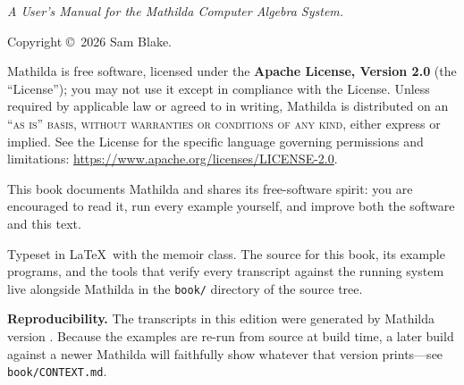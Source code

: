 \thispagestyle{empty}
\noindent
\textit{A User's Manual for the Mathilda Computer Algebra System.}

\vspace{1em}
\noindent
Copyright \copyright\ 2026 Sam Blake.

\vspace{1em}
\noindent
Mathilda is free software, licensed under the \textbf{Apache License, Version 2.0}
(the ``License''); you may not use it except in compliance with the License.
Unless required by applicable law or agreed to in writing, Mathilda is
distributed on an \textsc{``as is'' basis, without warranties or conditions of
any kind}, either express or implied. See the License for the specific language
governing permissions and limitations:
\url{https://www.apache.org/licenses/LICENSE-2.0}.

\vspace{1em}
\noindent
This book documents Mathilda and shares its free-software spirit: you are
encouraged to read it, run every example yourself, and improve both the software
and this text.

\vspace{1em}
\noindent
Typeset in \LaTeX\ with the \textsf{memoir} class. The source for this book, its
example programs, and the tools that verify every transcript against the running
system live alongside Mathilda in the \texttt{book/} directory of the source
tree.

\vfill
\noindent
\textbf{Reproducibility.} The transcripts in this edition were generated by
Mathilda version \texttt{\mathildaversion}. Because the examples are re-run from
source at build time, a later build against a newer Mathilda will faithfully show
whatever that version prints---see \texttt{book/CONTEXT.md}.

\newpage
